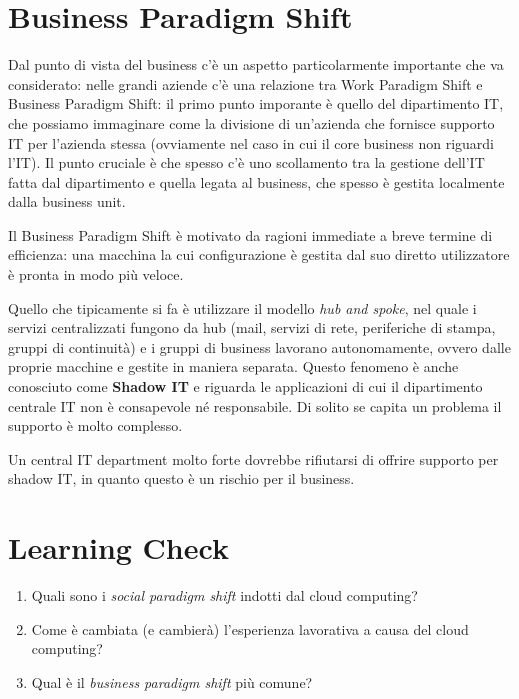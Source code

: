 \section{Business Paradigm Shift}
Dal punto di vista del business c'è un aspetto particolarmente importante che va considerato: nelle grandi aziende c'è una relazione tra Work Paradigm Shift e Business Paradigm Shift: il primo punto imporante è quello del dipartimento IT, che possiamo immaginare come la divisione di un'azienda che fornisce supporto IT per l'azienda stessa (ovviamente nel caso in cui il core business non riguardi l'IT). Il punto cruciale è che spesso c'è uno scollamento tra la gestione dell'IT fatta dal dipartimento e quella legata al business, che spesso è gestita localmente dalla business unit. 

Il Business Paradigm Shift è motivato da ragioni immediate a breve termine di efficienza: una macchina la cui configurazione è gestita dal suo diretto utilizzatore è pronta in modo più veloce.

\vspace{5mm}

Quello che tipicamente si fa è utilizzare il modello \textit{hub and spoke}, nel quale i servizi centralizzati fungono da hub (mail, servizi di rete, periferiche di stampa, gruppi di continuità) e i gruppi di business lavorano autonomamente, ovvero dalle proprie macchine e gestite in maniera separata. Questo fenomeno è anche conosciuto come \textbf{Shadow IT} e riguarda le applicazioni di cui il dipartimento centrale IT non è consapevole né responsabile. Di solito se capita un problema il supporto è molto complesso.

Un central IT department molto forte dovrebbe rifiutarsi di offrire supporto per shadow IT, in quanto questo è un rischio per il business.

\section{Learning Check}
\begin{enumerate}
    \item Quali sono i \textit{social paradigm shift} indotti dal cloud computing?
    \item Come è cambiata (e cambierà) l'esperienza lavorativa a causa del cloud computing?
    \item Qual è il \textit{business paradigm shift} più comune?
\end{enumerate}
